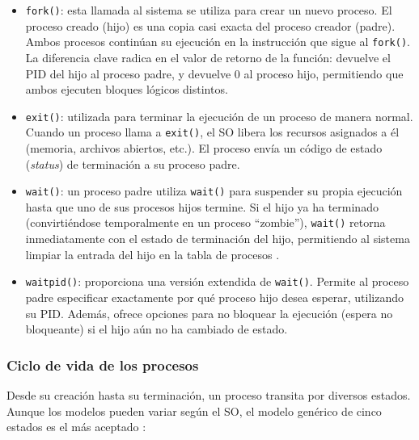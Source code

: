 \begin{itemize}[leftmargin=*]
    \item \texttt{fork()}: esta llamada al sistema se utiliza para crear un nuevo proceso. El proceso creado (hijo) es una copia casi exacta del proceso creador (padre). Ambos procesos continúan su ejecución en la instrucción que sigue al \texttt{fork()}. La diferencia clave radica en el valor de retorno de la función: devuelve el PID del hijo al proceso padre, y devuelve $0$ al proceso hijo, permitiendo que ambos ejecuten bloques lógicos distintos.
    \item \texttt{exit()}: utilizada para terminar la ejecución de un proceso de manera normal. Cuando un proceso llama a \texttt{exit()}, el SO libera los recursos asignados a él (memoria, archivos abiertos, etc.). El proceso envía un código de estado (\textit{status}) de terminación a su proceso padre.
    \item \texttt{wait()}: un proceso padre utiliza \texttt{wait()} para suspender su propia ejecución hasta que uno de sus procesos hijos termine. Si el hijo ya ha terminado (convirtiéndose temporalmente en un proceso ``zombie''), \texttt{wait()} retorna inmediatamente con el estado de terminación del hijo, permitiendo al sistema limpiar la entrada del hijo en la tabla de procesos \cite{stallings:os-internals:2017}.
    \item \texttt{waitpid()}: proporciona una versión extendida de \texttt{wait()}. Permite al proceso padre especificar exactamente por qué proceso hijo desea esperar, utilizando su PID. Además, ofrece opciones para no bloquear la ejecución (espera no bloqueante) si el hijo aún no ha cambiado de estado.
\end{itemize}

\subsubsection{Ciclo de vida de los procesos}

Desde su creación hasta su terminación, un proceso transita por diversos estados. Aunque los modelos pueden variar según el SO, el modelo genérico de cinco estados es el más aceptado \cite{silberschatz:os-concepts:2018}:

